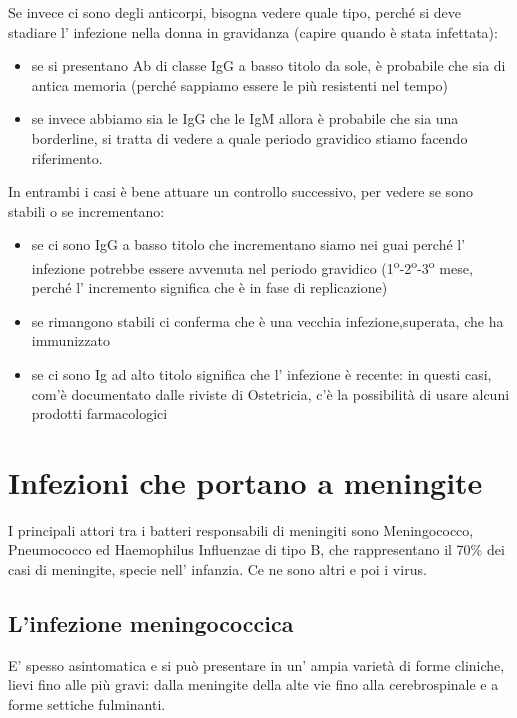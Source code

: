   Se invece ci sono degli anticorpi, bisogna vedere quale tipo, perché
  si deve stadiare l' infezione nella donna in gravidanza (capire quando
  è stata infettata):
  \begin{itemize}
  
\item
  se si presentano Ab di classe IgG a basso titolo da sole, è probabile
  che sia di antica memoria (perché sappiamo essere le più resistenti
  nel tempo)
\item
  se invece abbiamo sia le IgG che le IgM allora è probabile che sia una
  borderline, si tratta di vedere a quale periodo gravidico stiamo
  facendo riferimento.
\end{itemize}
  In entrambi i casi è bene attuare un controllo successivo, per vedere
  se sono stabili o se incrementano:

\begin{itemize}
\item
  se ci sono IgG a basso titolo che incrementano siamo nei guai perché
  l' infezione potrebbe essere avvenuta nel periodo gravidico (1\textsuperscript{o}-2\textsuperscript{o}-3\textsuperscript{o}
  mese, perché l' incremento significa che è in fase di replicazione)
\item
  se rimangono stabili ci conferma che è una vecchia infezione,superata,
  che ha immunizzato
\item
  se ci sono Ig ad alto titolo significa che l' infezione è recente: in
  questi casi, com'è documentato dalle riviste di Ostetricia, c'è la
  possibilità di usare alcuni prodotti farmacologici
\end{itemize}

\section{Infezioni che portano a meningite}
  I principali attori tra i batteri responsabili di meningiti sono
  Meningococco, Pneumococco ed Haemophilus Influenzae di tipo B, che
  rappresentano il 70\% dei casi di meningite, specie nell' infanzia. Ce
  ne sono altri e poi i virus.

\subsection{L'infezione meningococcica}
  E' spesso asintomatica e si può presentare in un' ampia varietà di
  forme cliniche, lievi fino alle più gravi: dalla meningite della alte
  vie fino alla cerebrospinale e a forme settiche fulminanti.

